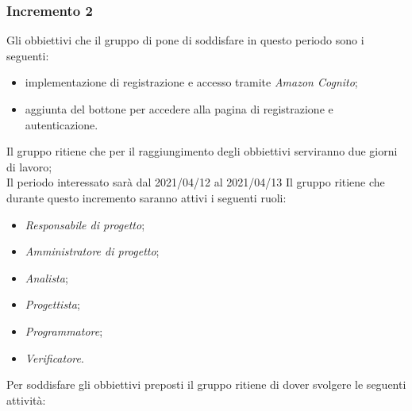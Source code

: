 \subsubsection{Incremento 2}
Gli obbiettivi che il gruppo di pone di soddisfare in questo periodo sono i seguenti:
\begin{itemize}
    \item implementazione di registrazione e accesso tramite \textit{Amazon Cognito};
    \item aggiunta del bottone per accedere alla pagina di registrazione e autenticazione.
\end{itemize}
Il gruppo ritiene che per il raggiungimento degli obbiettivi serviranno due giorni di lavoro;\\
Il periodo interessato sarà dal 2021/04/12 al 2021/04/13
Il gruppo ritiene che durante questo incremento saranno attivi i seguenti ruoli:
\begin{itemize}
    \item \textit{Responsabile di progetto};
    \item \textit{Amministratore di progetto};
    \item \textit{Analista};
    \item \textit{Progettista};
    \item \textit{Programmatore};
    \item \textit{Verificatore}.
\end{itemize}
Per soddisfare gli obbiettivi preposti il gruppo ritiene di dover svolgere le seguenti attività:
